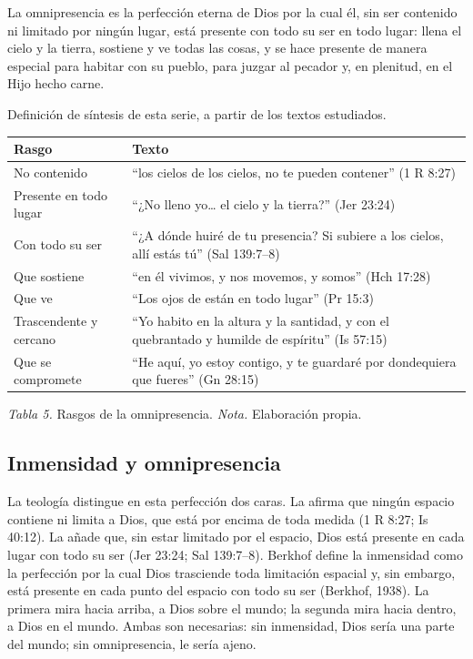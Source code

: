 \begin{tcolorbox}[colback=papiro,colframe=azul,boxrule=1pt,arc=3pt,title={Definición},colbacktitle=azul,coltitle=papiro]
La omnipresencia es la perfección eterna de Dios por la cual él, sin ser contenido ni limitado por ningún lugar, está presente con todo su ser en todo lugar: llena el cielo y la tierra, sostiene y ve todas las cosas, y se hace presente de manera especial para habitar con su pueblo, para juzgar al pecador y, en plenitud, en el Hijo hecho carne.
\end{tcolorbox}
{\footnotesize\color{gris}Definición de síntesis de esta serie, a partir de los textos estudiados.}\medskip

\begin{center}\small\renewcommand{\arraystretch}{1.2}
\begin{tabular}{@{}L{3.6cm}L{10.4cm}@{}}
\toprule
\textbf{Rasgo} & \textbf{Texto} \\ \midrule
No contenido & ``los cielos de los cielos, no te pueden contener'' (1 R 8:27) \\
Presente en todo lugar & ``¿No lleno yo\ldots{} el cielo y la tierra?'' (Jer 23:24) \\
Con todo su ser & ``¿A dónde huiré de tu presencia? Si subiere a los cielos, allí estás tú'' (Sal 139:7--8) \\
Que sostiene & ``en él vivimos, y nos movemos, y somos'' (Hch 17:28) \\
Que ve & ``Los ojos de \SENOR{} están en todo lugar'' (Pr 15:3) \\
Trascendente y cercano & ``Yo habito en la altura y la santidad, y con el quebrantado y humilde de espíritu'' (Is 57:15) \\
Que se compromete & ``He aquí, yo estoy contigo, y te guardaré por dondequiera que fueres'' (Gn 28:15) \\
\bottomrule
\end{tabular}\par
{\footnotesize\color{gris}\textit{Tabla 5.} Rasgos de la omnipresencia. \textit{Nota.} Elaboración propia.}
\end{center}

\subsection{Inmensidad y omnipresencia}

La teología distingue en esta perfección dos caras. La  afirma que ningún espacio contiene ni limita a Dios, que está por encima de toda medida (1 R 8:27; Is 40:12). La  añade que, sin estar limitado por el espacio, Dios está presente en cada lugar con todo su ser (Jer 23:24; Sal 139:7--8). Berkhof define la inmensidad como la perfección por la cual Dios trasciende toda limitación espacial y, sin embargo, está presente en cada punto del espacio con todo su ser (Berkhof, 1938). La primera mira hacia arriba, a Dios sobre el mundo; la segunda mira hacia dentro, a Dios en el mundo. Ambas son necesarias: sin inmensidad, Dios sería una parte del mundo; sin omnipresencia, le sería ajeno.

